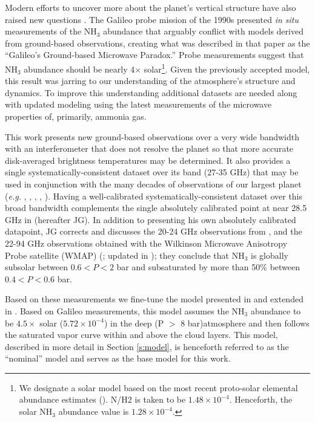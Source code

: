 \documentclass{article}
\newcommand{\e}[1]{\times 10^{#1}}
\begin{document}
	Modern efforts to uncover more about the planet's vertical structure have also raised new questions \citep{2005Icar..173..425D}.
	The Galileo probe mission of the 1990s presented {\sl in situ} measurements of the NH$_{3}$ abundance that arguably conflict with models derived from ground-based observations, creating what was described in that paper as the ``Galileo's Ground-based Microwave Paradox.''
	Probe measurements suggest that NH$_{3}$ abundance should be nearly 4$\times$ solar\footnote{We designate a solar model based on the most recent proto-solar elemental abundance estimates (\citealt{2009ARA&A..47..481A}). N/H2 is taken to be $1.48 \e{-4}$. Henceforth, the solar NH$_{3}$ abundance value is $1.28 \e{-4}$.}. 
	Given the previously accepted model, this result was jarring to our understanding of the atmosphere's structure and dynamics.  To improve this understanding additional datasets are needed along with updated modeling using the latest measurements of the microwave properties of, primarily, ammonia gas.

	This work presents new ground-based observations over a very wide bandwidth with an interferometer that does not resolve the planet so that more accurate disk-averaged brightness temperatures may be determined.  It also provides a single systematically-consistent dataset over its band (27-35 GHz) that may be used in conjunction with the many decades of observations of our largest planet ({\em e.g.} \citealt{1978Icar...35...44K}, \citealt{2003ApJS..148...39P}, \citealt{2011ApJS..192...19W}, \citealt{2005Icar..173..439G}, \citealt{2016Sci...352.1198D}).
	Having a well-calibrated systematically-consistent dataset over this broad bandwidth complements the single absolutely calibrated point at near 28.5 GHz in \citealt{2005Icar..173..439G} (hereafter JG).
	 In addition to presenting his own absolutely calibrated datapoint, JG corrects and discusses the 20-24 GHz observations from \citealt{1978Icar...35...44K}, and the 22-94 GHz observations obtained with the Wilkinson Microwave Anisotropy Probe satellite (WMAP) (\citealt{2003ApJS..148...39P}; updated in \citealt{2011ApJS..192...19W}); they conclude that NH$_{3}$ is globally subsolar between $0.6 < P < 2$ bar and subsaturated by more than 50\% between $0.4 < P < 0.6$ bar.
	 
	Based on these measurements we fine-tune the model presented in \citealt{2001Icar..149...66D} and extended in \citealt{2016Sci...352.1198D}. Based on Galileo measurements, this model assumes the NH$_{3}$ abundance to be $4.5 \times$ solar ($5.72 \e{-4}$) in the deep (P $>$ 8 bar)atmosphere and then follows the saturated vapor curve within and above the cloud layers.
	This model, described in more detail in Section \ref{s:model}, is henceforth referred to as the ``nominal'' model and serves as the base model for this work.
\end{document}
